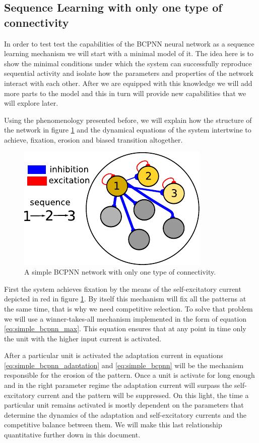 \documentclass[10pt,a4paper]{article}
\begin{document}
\subsection{Sequence Learning with only one type of connectivity}
In order to test test the capabilities of the BCPNN neural network as a sequence learning mechanism we will start with a minimal model of it. The idea here is to show the minimal conditions under which the system can successfully reproduce sequential activity and isolate how the parameters and properties of the network interact with each other. After we are equipped with this knowledge we will add more parts to the model and this in turn will provide new capabilities that we will explore later. 

Using the phenomenology presented before, we will explain how the structure of the network in figure \ref{fig:bcpnn_simple_network} and the dynamical equations of the system intertwine to achieve, fixation, erosion and biased transition altogether. 

\begin{figure}[H]
\centering
\includegraphics[scale=1.40]{simple_BCPNN.pdf}
\caption{A simple BCPNN network with only one type of connectivity.}
\label{fig:bcpnn_simple_network}
\end{figure}

First the system achieves fixation by the means of the self-excitatory current depicted in red in figure \ref{fig:bcpnn_simple_network}. By itself this mechanism will fix all the patterns at the same time, that is why we need competitive selection.  To solve that problem we will use a winner-takes-all mechanism \cite{yuille1998winner} implemented in the form of equation \ref{eq:simple_bcpnn_max}. This equation ensures that at any point in time only the unit with the higher input current is activated. 


After a particular unit is activated the adaptation current in equations \ref{eq:simple_bcpnn_adaptation} and \ref{eq:simple_bcpnn}  will be the mechanism responsible for the erosion of the pattern. Once a unit is activate for long enough and in the right parameter regime the adaptation current will surpass the self-excitatory current and the pattern will be suppressed. On this light, the time a particular unit remains activated is mostly dependent on the parameters that determine the dynamics of the adaptation and self-excitatory currents and the competitive balance between them. We will make this last relationship quantitative further down in this document. 
\end{document}
